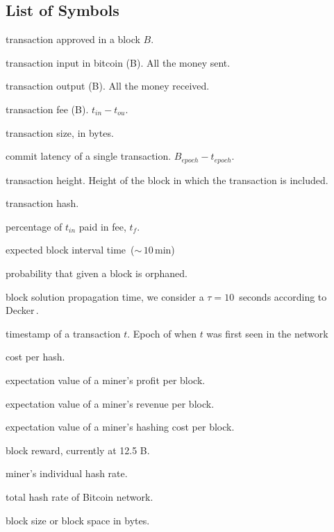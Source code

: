 \documentclass[USenglish]{uit-thesis}
\def\bitcoin{\leavevmode\rlap{\hskip.5pt-}B}
\begin{document}
\begin{appendices}
\chapter{List of Symbols}
\label{app:LOS}
\begin{description}[leftmargin=!, labelwidth=\widthof{\bfseries $M_{demand}(b)$ }]
	\setlength\itemsep{1em}
	\item [$t_B$] transaction approved in a block $B$.
	\item [$t_{in}$] transaction input in bitcoin (\bitcoin). All the money sent.
	\item [$t_{ou}$] transaction output (\bitcoin). All the money received.
	\item [$t_{f}$] transaction fee (\bitcoin). $t_{in} - t_{ou}$.
	\item [$t_q$] transaction size, in bytes.
	\item [$t_l$] commit latency of a single transaction. $B_{epoch} - t_{epoch}$.
	\item [$t_h$] transaction height. Height of the block in which the transaction is included.
	\item [$t_{ha}$] transaction hash.
	\item [$t_\%$] percentage of $t_{in}$ paid in fee, $t_f$.
	\item [$\mathcal{T}$] expected block interval time~($\sim$\,$10$\,min)
	\item [$\mathbb{P}_{orphan}$] probability that given a block is orphaned.
	\item [$\tau$] block solution propagation time, we consider a $\tau = 10$\,
	seconds according to Decker\,\cite{Decker2013IPBN}. %
	\item [$t_{epoch}$] timestamp of a transaction $t$.
	Epoch of when $t$ was first seen in the network
	\item [$\eta$] cost per hash.
	\item [$\langle \Pi \rangle$] expectation value of a miner’s profit per block.
	\item [$\langle V\rangle$] expectation value of a miner’s revenue per block.
	\item [$\langle C\rangle$] expectation value of a miner's hashing cost per block.
	\item [$R$] block reward, currently at 12.5 \bitcoin.
	\item [$h$] miner's individual hash rate.
	\item [$H$] total hash rate of Bitcoin network.
	\item [$Q$] block size or block space in bytes.

\end{description}
\end{appendices}
\end{document}
